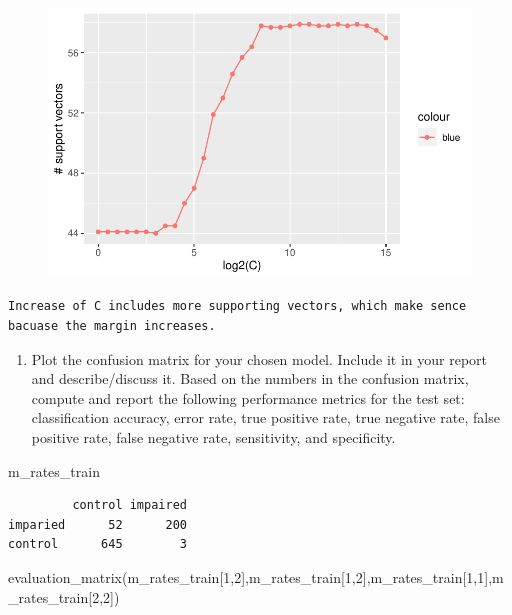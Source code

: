 \documentclass[
  letterpaper,
  DIV=11,
  numbers=noendperiod]{scrartcl}
\newenvironment{Shaded}{\begin{snugshade}}{\end{snugshade}}
\newcommand{\DecValTok}[1]{\textcolor[rgb]{0.68,0.00,0.00}{#1}}
\newcommand{\FunctionTok}[1]{\textcolor[rgb]{0.28,0.35,0.67}{#1}}
\newcommand{\NormalTok}[1]{\textcolor[rgb]{0.00,0.23,0.31}{#1}}
\providecommand{\tightlist}{%
  \setlength{\itemsep}{0pt}\setlength{\parskip}{0pt}}\usepackage{longtable,booktabs,array}
\begin{document}
\begin{figure}[H]

{\centering \includegraphics{excercise_doc_files/figure-pdf/unnamed-chunk-29-1.pdf}

}

\end{figure}

\begin{verbatim}
Increase of C includes more supporting vectors, which make sence bacuase the margin increases.
\end{verbatim}

\begin{enumerate}
\def\labelenumi{(\alph{enumi})}
\setcounter{enumi}{9}
\tightlist
\item
  Plot the confusion matrix for your chosen model. Include it in your
  report and describe/discuss it. Based on the numbers in the confusion
  matrix, compute and report the following performance metrics for the
  test set: classification accuracy, error rate, true positive rate,
  true negative rate, false positive rate, false negative rate,
  sensitivity, and specificity.
\end{enumerate}

\begin{Shaded}
\begin{Highlighting}[]
\NormalTok{m\_rates\_train}
\end{Highlighting}
\end{Shaded}

\begin{verbatim}
         control impaired
imparied      52      200
control      645        3
\end{verbatim}

\begin{Shaded}
\begin{Highlighting}[]
\FunctionTok{evaluation\_matrix}\NormalTok{(m\_rates\_train[}\DecValTok{1}\NormalTok{,}\DecValTok{2}\NormalTok{],m\_rates\_train[}\DecValTok{1}\NormalTok{,}\DecValTok{2}\NormalTok{],m\_rates\_train[}\DecValTok{1}\NormalTok{,}\DecValTok{1}\NormalTok{],m\_rates\_train[}\DecValTok{2}\NormalTok{,}\DecValTok{2}\NormalTok{])}
\end{Highlighting}
\end{Shaded}
\end{document}
